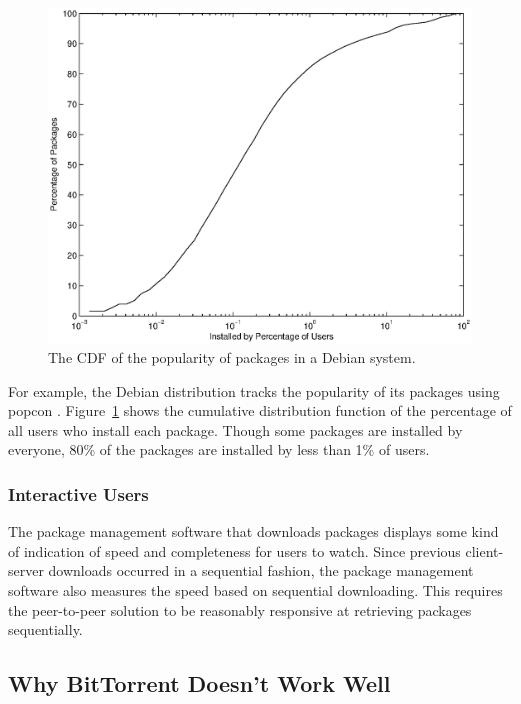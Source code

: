 \documentclass[conference]{IEEEtran}
\begin{document}
\begin{figure}
\centering
\includegraphics[width=\columnwidth]{apt_p2p_popularity-cdf.eps}
\caption{The CDF of the popularity of packages in a Debian system.}
\label{popularity_CDF}
\end{figure}

For example, the Debian distribution tracks the popularity of its
packages using popcon \cite{popcon}. Figure~\ref{popularity_CDF}
shows the cumulative distribution function of the percentage of all
users who install each package. Though some packages are installed
by everyone, 80\% of the packages are installed by less than 1\% of
users.

\subsubsection{Interactive Users}

The package management software that downloads packages displays
some kind of indication of speed and completeness for users to
watch. Since previous client-server downloads occurred in a sequential
fashion, the package management software also measures the speed
based on sequential downloading. This requires the peer-to-peer
solution to be reasonably responsive at retrieving packages
sequentially.

\subsection{Why BitTorrent Doesn't Work Well}
\label{bittorrent}
\end{document}
